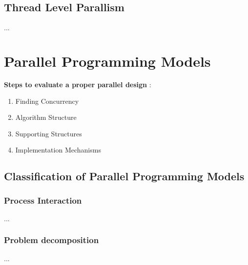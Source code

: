 \subsection{Thread Level Parallism}

...\parencite[see][p24]{book1}

\section{Parallel Programming Models}

\textbf{Steps to evaluate a proper parallel design} \parencite[see][p6]{article6}:
\begin{enumerate}
	\item Finding Concurrency
	\item Algorithm Structure
	\item Supporting Structures
	\item Implementation Mechanisms
\end{enumerate}

\newpage

\subsection{Classification of Parallel Programming Models}

\subsubsection{Process Interaction}

...\parencite[see][p4]{internet1}

\subsubsection{Problem decomposition}

...\parencite[see][p105 ff.]{book1}